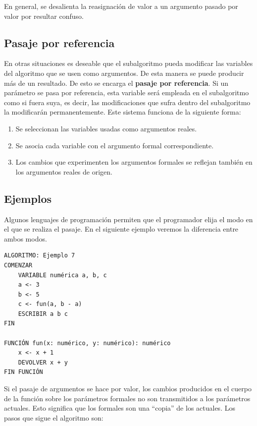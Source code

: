 \documentclass[]{book}
\providecommand{\tightlist}{%
  \setlength{\itemsep}{0pt}\setlength{\parskip}{0pt}}
\begin{document}
En general, se desalienta la reasignación de valor a un argumento pasado por valor por resultar confuso.

\hypertarget{pasaje-por-referencia}{%
\subsection{Pasaje por referencia}\label{pasaje-por-referencia}}

En otras situaciones es deseable que el subalgoritmo pueda modificar las variables del algoritmo que se usen como argumentos. De esta manera se puede producir más de un resultado. De esto se encarga el \textbf{pasaje por referencia}. Si un parámetro se pasa por referencia, esta variable será empleada en el subalgoritmo como si fuera suya, es decir, las modificaciones que sufra dentro del subalgoritmo la modificarán permanentemente. Este sistema funciona de la siguiente forma:

\begin{enumerate}
\def\labelenumi{\arabic{enumi}.}
\tightlist
\item
  Se seleccionan las variables usadas como argumentos reales.
\item
  Se asocia cada variable con el argumento formal correspondiente.
\item
  Los cambios que experimenten los argumentos formales se reflejan también en los argumentos reales de origen.
\end{enumerate}

\hypertarget{ejemplos}{%
\subsection{Ejemplos}\label{ejemplos}}

Algunos lenguajes de programación permiten que el programador elija el modo en el que se realiza el pasaje. En el siguiente ejemplo veremos la diferencia entre ambos modos.

\begin{verbatim}
ALGORITMO: Ejemplo 7
COMENZAR
    VARIABLE numérica a, b, c
    a <- 3
    b <- 5
    c <- fun(a, b - a)
    ESCRIBIR a b c
FIN

FUNCIÓN fun(x: numérico, y: numérico): numérico
    x <- x + 1
    DEVOLVER x + y
FIN FUNCIÓN
\end{verbatim}

Si el pasaje de argumentos se hace por valor, los cambios producidos en el cuerpo de la función sobre los parámetros formales no son transmitidos a los parámetros actuales. Esto significa que los formales son una ``copia'' de los actuales. Los pasos que sigue el algoritmo son:
\end{document}

